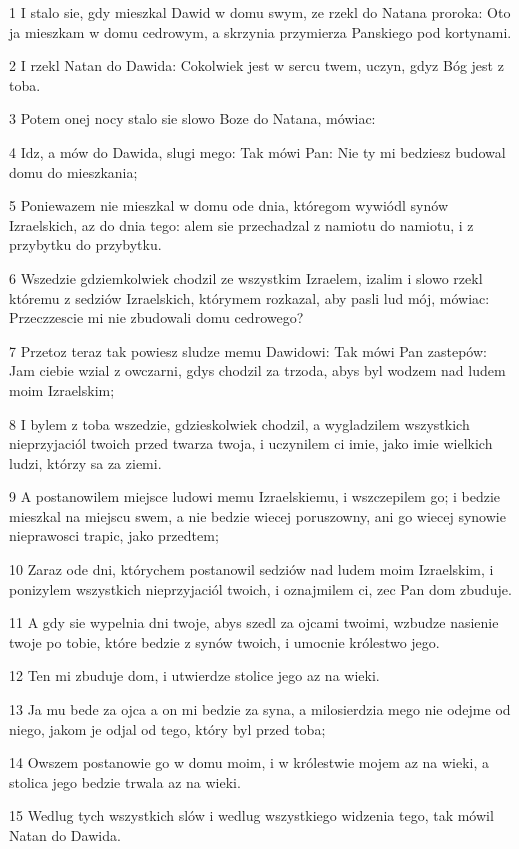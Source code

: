 \par 1 I stalo sie, gdy mieszkal Dawid w domu swym, ze rzekl do Natana proroka: Oto ja mieszkam w domu cedrowym, a skrzynia przymierza Panskiego pod kortynami.
\par 2 I rzekl Natan do Dawida: Cokolwiek jest w sercu twem, uczyn, gdyz Bóg jest z toba.
\par 3 Potem onej nocy stalo sie slowo Boze do Natana, mówiac:
\par 4 Idz, a mów do Dawida, slugi mego: Tak mówi Pan: Nie ty mi bedziesz budowal domu do mieszkania;
\par 5 Poniewazem nie mieszkal w domu ode dnia, któregom wywiódl synów Izraelskich, az do dnia tego: alem sie przechadzal z namiotu do namiotu, i z przybytku do przybytku.
\par 6 Wszedzie gdziemkolwiek chodzil ze wszystkim Izraelem, izalim i slowo rzekl któremu z sedziów Izraelskich, którymem rozkazal, aby pasli lud mój, mówiac: Przeczzescie mi nie zbudowali domu cedrowego?
\par 7 Przetoz teraz tak powiesz sludze memu Dawidowi: Tak mówi Pan zastepów: Jam ciebie wzial z owczarni, gdys chodzil za trzoda, abys byl wodzem nad ludem moim Izraelskim;
\par 8 I bylem z toba wszedzie, gdzieskolwiek chodzil, a wygladzilem wszystkich nieprzyjaciól twoich przed twarza twoja, i uczynilem ci imie, jako imie wielkich ludzi, którzy sa za ziemi.
\par 9 A postanowilem miejsce ludowi memu Izraelskiemu, i wszczepilem go; i bedzie mieszkal na miejscu swem, a nie bedzie wiecej poruszowny, ani go wiecej synowie nieprawosci trapic, jako przedtem;
\par 10 Zaraz ode dni, którychem postanowil sedziów nad ludem moim Izraelskim, i ponizylem wszystkich nieprzyjaciól twoich, i oznajmilem ci, zec Pan dom zbuduje.
\par 11 A gdy sie wypelnia dni twoje, abys szedl za ojcami twoimi, wzbudze nasienie twoje po tobie, które bedzie z synów twoich, i umocnie królestwo jego.
\par 12 Ten mi zbuduje dom, i utwierdze stolice jego az na wieki.
\par 13 Ja mu bede za ojca a on mi bedzie za syna, a milosierdzia mego nie odejme od niego, jakom je odjal od tego, który byl przed toba;
\par 14 Owszem postanowie go w domu moim, i w królestwie mojem az na wieki, a stolica jego bedzie trwala az na wieki.
\par 15 Wedlug tych wszystkich slów i wedlug wszystkiego widzenia tego, tak mówil Natan do Dawida.
